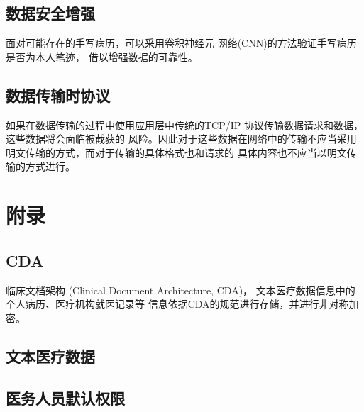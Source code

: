 \documentclass[UTF8]{ctexart}
\begin{document}
    \subsection{数据安全增强}
    \par
    面对可能存在的手写病历，可以采用卷积神经元
    网络(CNN)的方法验证手写病历是否为本人笔迹，
    借以增强数据的可靠性。
    \subsection{数据传输时协议}
    \par
    如果在数据传输的过程中使用应用层中传统的TCP/IP
    协议传输数据请求和数据，这些数据将会面临被截获的
    风险。因此对于这些数据在网络中的传输不应当采用
    明文传输的方式，而对于传输的具体格式也和请求的
    具体内容也不应当以明文传输的方式进行。

    \newpage

    \section{附录}
    \subsection{CDA}
    \par
    临床文档架构
    (Clinical Document Architecture, CDA)，
    文本医疗数据信息中的个人病历、医疗机构就医记录等
    信息依据CDA的规范进行存储，并进行非对称加密。
    \subsection{文本医疗数据}
    \par
    \subsection{医务人员默认权限}
    \par
\end{document}
